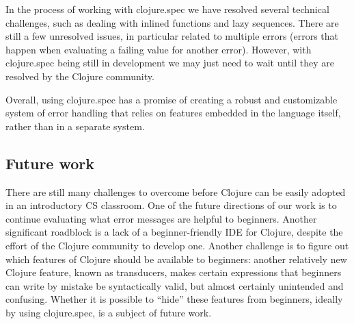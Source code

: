 \documentclass[12pt]{article}
\begin{document}
	In the process of working with clojure.spec we have resolved several technical challenges, such as 
	dealing with inlined functions and lazy sequences. 
	There are still a few unresolved issues, in particular related to multiple errors (errors that happen
	when evaluating a failing value for another error).
	However, with clojure.spec being still in development 
	we may just need to wait until they are resolved by the Clojure community. 

	Overall, using clojure.spec has a promise of creating a robust and customizable system of error 
	handling that relies on features embedded in the language itself, rather than in a separate system. 

	\subsection{Future work}
	There are still many challenges to overcome before Clojure can be easily adopted 
	in an introductory CS classroom. One of the future directions of our work is to continue evaluating what 
	error messages are helpful to beginners. Another significant roadblock is a lack of a beginner-friendly IDE 
	for Clojure, despite the effort of the Clojure community to develop one. Another challenge is to figure out which 
	features of Clojure should be available to beginners: another relatively new Clojure feature, known as transducers, 
	makes certain expressions that beginners can write by mistake be syntactically valid, but almost certainly unintended 
	and confusing. Whether it is possible to ``hide'' these  features from beginners, ideally by using clojure.spec,
	 is a subject of future work. 
	


\end{document}
